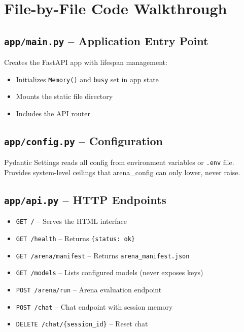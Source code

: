 \documentclass[12pt,a4paper]{article}
\begin{document}
\section{File-by-File Code Walkthrough}

\subsection{\texttt{app/main.py} -- Application Entry Point}

Creates the FastAPI app with lifespan management:
\begin{itemize}
  \item Initializes \texttt{Memory()} and \texttt{busy} set in app state
  \item Mounts the static file directory
  \item Includes the API router
\end{itemize}

\subsection{\texttt{app/config.py} -- Configuration}

Pydantic Settings reads all config from environment variables or \texttt{.env} file. Provides system-level ceilings that arena\_config can only lower, never raise.

\subsection{\texttt{app/api.py} -- HTTP Endpoints}

\begin{itemize}
  \item \texttt{GET /} -- Serves the HTML interface
  \item \texttt{GET /health} -- Returns \texttt{\{status: ok\}}
  \item \texttt{GET /arena/manifest} -- Returns \texttt{arena\_manifest.json}
  \item \texttt{GET /models} -- Lists configured models (never exposes keys)
  \item \texttt{POST /arena/run} -- Arena evaluation endpoint
  \item \texttt{POST /chat} -- Chat endpoint with session memory
  \item \texttt{DELETE /chat/\{session\_id\}} -- Reset chat
\end{itemize}
\end{document}
